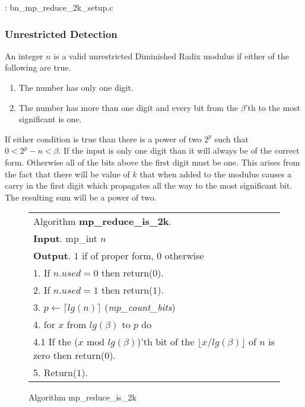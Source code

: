 \documentclass[b5paper]{book}
\begin{document}
\vspace{+3mm}\begin{small}
\hspace{-5.1mm}{\bf File}: bn\_mp\_reduce\_2k\_setup.c
\vspace{-3mm}
\begin{alltt}
\end{alltt}
\end{small}

\subsubsection{Unrestricted Detection}
An integer $n$ is a valid unrestricted Diminished Radix modulus if either of the following are true.

\begin{enumerate}
\item  The number has only one digit.
\item  The number has more than one digit and every bit from the $\beta$'th to the most significant is one.
\end{enumerate}

If either condition is true than there is a power of two $2^p$ such that $0 < 2^p - n < \beta$.   If the input is only
one digit than it will always be of the correct form.  Otherwise all of the bits above the first digit must be one.  This arises from the fact
that there will be value of $k$ that when added to the modulus causes a carry in the first digit which propagates all the way to the most
significant bit.  The resulting sum will be a power of two.

\begin{figure}[!here]
\begin{small}
\begin{center}
\begin{tabular}{l}
\hline Algorithm \textbf{mp\_reduce\_is\_2k}. \\
\textbf{Input}.   mp\_int $n$   \\
\textbf{Output}.  $1$ if of proper form, $0$ otherwise \\
\hline
1.  If $n.used = 0$ then return($0$). \\
2.  If $n.used = 1$ then return($1$). \\
3.  $p \leftarrow \lceil lg(n) \rceil$  (\textit{mp\_count\_bits}) \\
4.  for $x$ from $lg(\beta)$ to $p$ do \\
\hspace{3mm}4.1  If the ($x \mbox{ mod }lg(\beta)$)'th bit of the $\lfloor x / lg(\beta) \rfloor$ of $n$ is zero then return($0$). \\
5.  Return($1$). \\
\hline
\end{tabular}
\end{center}
\end{small}
\caption{Algorithm mp\_reduce\_is\_2k}
\end{figure}
\end{document}
